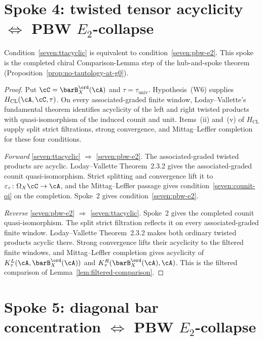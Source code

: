 \section{Spoke 4: twisted tensor acyclicity
\texorpdfstring{$\Leftrightarrow$}{iff} PBW $E_2$-collapse}
\label{sec:ftm-spoke-4}

\begin{proposition}
\label{prop:ftm-spoke-ttacyclic-pbw}
Condition~\ref{seven:ttacyclic} is equivalent to
condition~\ref{seven:pbw-e2}.  This spoke is the completed chiral
Comparison-Lemma step of the hub-and-spoke theorem
\textup{(}Proposition~\ref{prop:no-tautology-at-g0}\textup{)}.
\end{proposition}

\begin{proof}
Put $\cC=\barB_X^{\ord}(\cA)$ and
$\tau=\tau_{\mathrm{univ}}$.  Hypothesis~\textup{(W6)} supplies
$H_{\mathrm{CL}}(\cA,\cC,\tau)$.  On every associated-graded finite
window, Loday--Vallette's fundamental theorem
\cite[Theorem~2.3.2]{LodayVallette12} identifies acyclicity of the
left and right twisted products with quasi-isomorphism of the induced
counit and unit.  Items~\textup{(ii)} and~\textup{(v)} of
$H_{\mathrm{CL}}$ supply split strict filtrations, strong convergence,
and Mittag--Leffler completion for these four conditions.

\emph{Forward} \ref{seven:ttacyclic} $\Rightarrow$
\ref{seven:pbw-e2}.  The associated-graded twisted products are
acyclic.  Loday--Vallette Theorem~2.3.2 gives the associated-graded
counit quasi-isomorphism.  Strict splitting and convergence lift it to
$\varepsilon_\tau\colon\Omega_X\cC\to\cA$, and the
Mittag--Leffler passage gives condition~\ref{seven:counit-qi} on the
completion.  Spoke~2 gives condition~\ref{seven:pbw-e2}.

\emph{Reverse} \ref{seven:pbw-e2} $\Rightarrow$ \ref{seven:ttacyclic}.
Spoke~2 gives the completed counit quasi-isomorphism.  The split
strict filtration reflects it on every associated-graded finite
window.  Loday--Vallette Theorem~2.3.2 makes both ordinary twisted
products acyclic there.  Strong convergence lifts their acyclicity to
the filtered finite windows, and Mittag--Leffler completion gives
acyclicity of
$K_\tau^L(\cA,\barB^{\ord}_X(\cA))$ and
$K_\tau^R(\barB^{\ord}_X(\cA),\cA)$.  This is the filtered comparison
of Lemma~\ref{lem:filtered-comparison}.
\end{proof}

\section{Spoke 5: diagonal bar concentration
\texorpdfstring{$\Leftrightarrow$}{iff} PBW $E_2$-collapse}
\label{sec:ftm-spoke-5}

